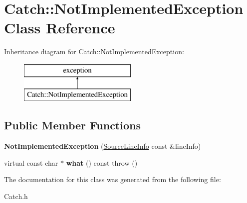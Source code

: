 \hypertarget{class_catch_1_1_not_implemented_exception}{\section{Catch\-:\-:Not\-Implemented\-Exception Class Reference}
\label{class_catch_1_1_not_implemented_exception}
}
Inheritance diagram for Catch\-:\-:Not\-Implemented\-Exception\-:\begin{figure}[H]
\begin{center}
\leavevmode
\includegraphics[height=2.000000cm]{class_catch_1_1_not_implemented_exception}
\end{center}
\end{figure}
\subsection*{Public Member Functions}
\begin{DoxyCompactItemize}
\item 
\hypertarget{class_catch_1_1_not_implemented_exception_ab4f0a5c39d8ffb72c664e2c07e180634}{{\bfseries Not\-Implemented\-Exception} (\hyperlink{struct_catch_1_1_source_line_info}{Source\-Line\-Info} const \&line\-Info)}\label{class_catch_1_1_not_implemented_exception_ab4f0a5c39d8ffb72c664e2c07e180634}

\item 
\hypertarget{class_catch_1_1_not_implemented_exception_a9d262173d2e1a5acccf8eb7b3a4859b6}{virtual const char $\ast$ {\bfseries what} () const   throw ()}\label{class_catch_1_1_not_implemented_exception_a9d262173d2e1a5acccf8eb7b3a4859b6}

\end{DoxyCompactItemize}


The documentation for this class was generated from the following file\-:\begin{DoxyCompactItemize}
\item 
Catch.\-h\end{DoxyCompactItemize}
